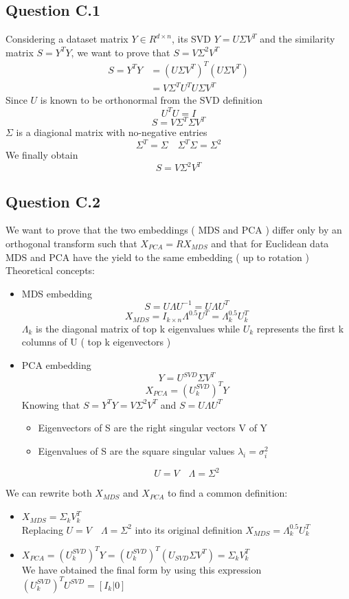 \documentclass[a4paper]{scrartcl}
\begin{document}
\subsection*{Question C.1}
Considering a dataset matrix $Y \in R^{d \times n}$, its SVD $Y = U \Sigma V^T$ and the similarity matrix $S =Y^T Y$, we want to prove that $S = V \Sigma^2 V^T$
\begin{align*}
S = Y^T Y &= (U \Sigma V^T)^T (U \Sigma V^T)\\
&= V \Sigma^T U^T U \Sigma V^T
\end{align*}
Since $U$ is known to be orthonormal from the SVD definition
\[
U^T U = I
\]
\[
S = V \Sigma^T \Sigma V^T
\]
$\Sigma$ is a diagional matrix with no-negative entries
\[
\Sigma^T = \Sigma \quad \Sigma^T \Sigma = \Sigma^2
\]
We finally obtain
\[
S = V \Sigma^2 V^T
\]
\subsection*{Question C.2}
We want to prove that the two embeddings ( MDS and PCA ) differ only by an orthogonal transform such that $X_{PCA} = R X_{MDS}$ and that for Euclidean data MDS and PCA have the yield to the same embedding ( up to rotation )\\
Theoretical concepts:
\begin{itemize}
    \item MDS embedding
\[S = U \Lambda U^{-1} = U \Lambda U^T \]
\[X_{MDS} = I_{k \times n} \Lambda^{0.5} U^T = \Lambda_k^{0.5}U_k^T\]
$\Lambda_k$ is the diagonal matrix of top k eigenvalues while $U_k$ represents the first k columns of U ( top k eigenvectors )
    \item PCA embedding
\[
Y= U^{SVD} \Sigma V^T
\]
\[
X_{PCA} = (U_k^{SVD})^T Y
\]
Knowing that $S = Y^T Y = V \Sigma^2 V^T$ and $S = U \Lambda U^T$
\begin{itemize}
    \item Eigenvectors of S are the right singular vectors V of Y
    \item Eigenvalues of S are the square singular values $\lambda_i = \sigma_i^2$
\end{itemize}
\[
U = V \quad \Lambda = \Sigma^2
\]
\end{itemize}
\newpage
We can rewrite both $X_{MDS}$ and $X_{PCA}$ to find a common definition:
\begin{itemize}
    \item $X_{MDS} = \Sigma_k V_k^T$\\
Replacing $U = V \quad \Lambda = \Sigma^2$ into its original definition $X_{MDS} = \Lambda_k^{0.5} U_k^T$
    \item $X_{PCA} = (U_k^{SVD})^T Y = (U_k^{SVD})^T (U_{SVD} \Sigma V^T) = \Sigma_k V_k^T$\\
We have obtained the final form by using this expression $(U_k^{SVD})^T U^{SVD} = [ I_k | 0]$ 
\end{itemize}
\end{document}
